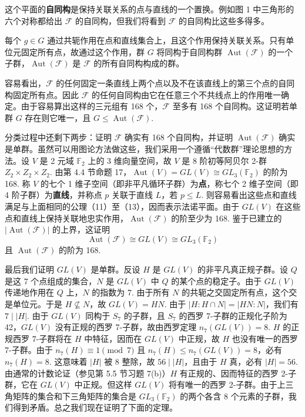 这个平面的\textbf{自同构}是保持关联关系的点与直线的一个置换。例如图 1 中三角形的六个对称都给出 \(\mathcal{F}\) 的自同构，但我们将看到 \(\mathcal{F}\) 的自同构比这些多得多。

每个 \(g \in G\) 通过共轭作用在点和直线集合上，且这个作用保持关联关系。只有单位元固定所有点，故通过这个作用，群 \(G\) 将同构于自同构群 \(\operatorname{Aut}(\mathcal{F})\) 的一个子群，\(\operatorname{Aut}(\mathcal{F})\) 是 \(\mathcal{F}\) 的所有自同构构成的群。

容易看出，\(\mathcal{F}\) 的任何固定一条直线上两个点以及不在该直线上的第三个点的自同构固定所有点。因此 \(\mathcal{F}\) 的任何自同构由它在任意三个不共线点上的作用唯一确定。由于容易算出这样的三元组有 168 个，\(\mathcal{F}\) 至多有 168 个自同构。这证明若单群 \(G\) 存在则它唯一，且 \(G \leq \operatorname{Aut}(\mathcal{F})\).

分类过程中还剩下两步：证明 \(\mathcal{F}\) 确实有 168 个自同构，并证明 \(\operatorname{Aut}(\mathcal{F})\) 确实是单群。虽然可以用图论方法做这些，我们采用一个遵循“代数群”理论思想的方法。设 \(V\) 是 2 元域 \(\mathbb{F}_2\) 上的 3 维向量空间，故 \(V\) 是 8 阶初等阿贝尔 2-群 \(Z_2 \times Z_2 \times Z_2\). 由第 4.4 节命题 17，\(\operatorname{Aut}(V) = GL(V) \cong GL_3(\mathbb{F}_2)\) 的阶为 168. 称 \(V\) 的七个 1 维子空间（即非平凡循环子群）为\textbf{点}，称七个 2 维子空间（即 4 阶子群）为\textbf{直线}，并称点 \(p\) 关联于直线 \(L\)，若 \(p \leq L\). 则容易看出这些点和直线满足与上面相同的公理（11）至（13），因而表示法诺平面。由于 \(GL(V)\) 在这些点和直线上保持关联地忠实作用，\(\operatorname{Aut}(\mathcal{F})\) 的阶至少为 168. 鉴于已建立的 \(|\operatorname{Aut}(\mathcal{F})|\) 的上界，这证明
\[
\operatorname{Aut}(\mathcal{F}) \cong GL(V) \cong GL_3(\mathbb{F}_2)
\]
且 \(\operatorname{Aut}(\mathcal{F})\) 的阶为 168.

最后我们证明 \(GL(V)\) 是单群。反设 \(H\) 是 \(GL(V)\) 的非平凡真正规子群。设 \(Q\) 是这 7 个点组成的集合，\(N\) 是 \(GL(V)\) 中 \(Q\) 的某个点的稳定子。由于 \(GL(V)\) 传递地作用在 \(Q\) 上，\(N\) 的指数为 7. 由于所有 \(N\) 的共轭之交固定所有点，这个交是单位元。于是 \(H \nsubseteq N\)，故 \(GL(V) = HN\). 由于 \(|H : H \cap N| = |HN : N|\)，我们有 \(7 \mid |H|\). 由于 \(GL(V)\) 同构于 \(S_7\) 的子群，且 \(S_7\) 的西罗 7-子群的正规化子阶为 42，\(GL(V)\) 没有正规的西罗 7-子群，故由西罗定理 \(n_7(GL(V)) = 8\). \(H\) 的正规西罗 7-子群将在 \(H\) 中特征，因而在 \(GL(V)\) 中正规，故 \(H\) 也没有唯一的西罗 7-子群。由于 \(n_7(H) \equiv 1 \pmod 7\) 且 \(n_7(H) \leq n_7(GL(V)) = 8\)，必有 \(n_7(H) = 8\). 这意味着 \(|H|\) 被 8 整除，故 \(56 \mid |H|\)，且由于 \(H\) 真，必有 \(|H| = 56\). 由通常的计数论证（参见第 5.5 节习题 7(b)）\(H\) 有正规的、因而特征的西罗 2-子群，它在 \(GL(V)\) 中正规。但这样 \(GL(V)\) 将有唯一的西罗 2-子群。由于上三角矩阵的集合和下三角矩阵的集合是 \(GL_3(\mathbb{F}_2)\) 的两个各含 8 个元素的子群，我们得到矛盾。总之我们现在证明了下面的定理。

